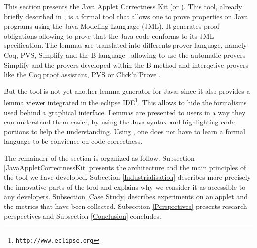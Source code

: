   This section presents the Java Applet Correctness Kit
 (or \JACK).  This tool, already briefly described in
 \cite{BR-gdc2002}, is a formal tool that allows one to prove properties on
 Java programs using the Java Modeling Language \cite{LBR00} (JML).
 It generates proof obligations
 allowing to prove that the Java code conforms to its JML
 specification.  The lemmas are translated into differents prover language, namely Coq, PVS, Simplify and the B language \cite{bbook},
 allowing to use the automatic provers Simplify and the provers developed within the B method and interqctive provers like the Coq proof assistant, PVS or Click'n'Prove .

 But the tool is not yet another lemma generator for Java, since it also provides a lemma
 viewer integrated in the eclipse
 IDE\footnote{\texttt{http://www.eclipse.org}}.  This allows to
 hide the formalisms used behind a graphical interface.  Lemmas are
 presented to users in a way they can understand them easier, by using the Java syntax and highlighting code portions to help
 the understanding. Using \JACK, one does not have to learn a formal language to be convience on
code correctness.

 The remainder of the section is organized as follow.  Subsection \ref{JavaAppletCorrectnessKit} presents the
 architecture and the main principles of the tool we have
 developed. Subection \ref{Industrialisation} describes more precisely
 the innovative parts of the tool and explains why we consider it as
 accessible to any developers. Subsection \ref{Case Study} describes
 experiments on an applet and the metrics that have been
 collected.  Subsection \ref{Perspectives} presents research perspectives
 and Subsection \ref{Conclusion} concludes.
